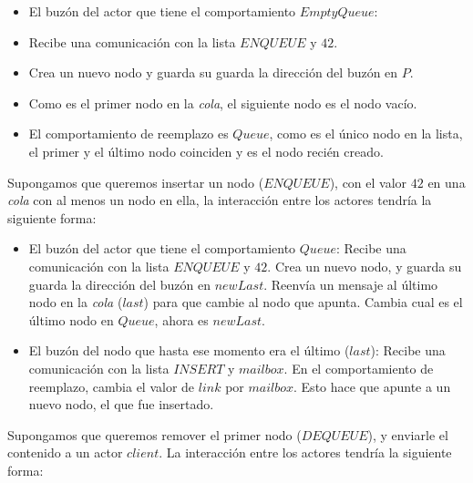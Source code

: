 \begin{itemize}
 \item El buzón del actor que tiene el comportamiento $EmptyQueue$:
 \item Recibe una comunicación con la lista $ENQUEUE$ y $42$.
 \item Crea un nuevo nodo y guarda su guarda la dirección del buzón en $P$.
 \item Como es el primer nodo en la \textit{cola}, el siguiente nodo es el nodo vacío.
 \item El comportamiento de reemplazo es $Queue$, como es el único nodo en la lista, el primer y el último nodo coinciden y es el nodo recién creado.
\end{itemize}

Supongamos que queremos insertar un nodo ($ENQUEUE$), con el valor $42$ en una \textit{cola} con al menos un nodo en ella, la interacción entre los actores tendría la siguiente forma:

\begin{itemize}
 \item El buzón del actor que tiene el comportamiento $Queue$:
 \subitem Recibe una comunicación con la lista $ENQUEUE$ y $42$.
 \subitem Crea un nuevo nodo, y guarda su guarda la dirección del buzón en $newLast$.
 \subitem Reenvía un mensaje al último nodo en la \textit{cola} ($last$) para que cambie al nodo que apunta.
 \subitem Cambia cual es el último nodo en $Queue$, ahora es $newLast$.
 \item El buzón del nodo que hasta ese momento era el último ($last$):
 \subitem Recibe una comunicación con la lista $INSERT$ y $mailbox$.
 \subitem En el comportamiento de reemplazo, cambia el valor de $link$ por $mailbox$. Esto hace que apunte a un nuevo nodo, el que fue insertado.
\end{itemize}

Supongamos que queremos remover el primer nodo ($DEQUEUE$), y enviarle el contenido a un actor $client$. La interacción entre los actores tendría la siguiente forma:

